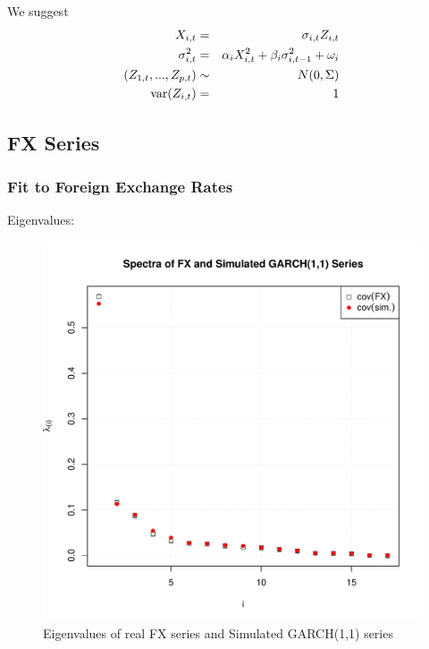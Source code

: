 \documentclass{beamer}
\begin{document}
\begin{frame}
  We suggest
  \begin{eqnarray*}
    X_{i, t} &=& \sigma_{i, t} Z_{i, t} \\
    \sigma_{i, t}^2 &=& \alpha_{i} X_{i, t}^2 + \beta_{i} \sigma_{i, t-1}^2 + \omega_i \\
    (Z_{1, t}, ..., Z_{p, t}) &\sim& N(0, \Sigma) \\
    \text{var}(Z_{i,t}) &=& 1
  \end{eqnarray*}
\end{frame}

\subsection{FX Series}
\begin{frame}
  \frametitle{Fit to Foreign Exchange Rates}
  Eigenvalues:
  \begin{figure}[htb!]
    \centering
    \includegraphics[scale=0.35]{FX_eigenvalues.pdf}
    \caption{\scriptsize Eigenvalues of real FX series and Simulated GARCH(1,1) series}
  \end{figure}
\end{frame}
\end{document}
